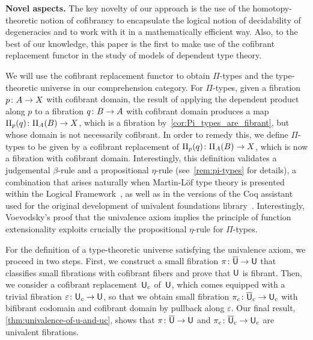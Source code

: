 \documentclass[reqno,10pt,a4paper,oneside,draft]{amsart}
\begin{document}
\smallskip

\noindent
\textbf{Novel aspects.} The key novelty of our approach is the use of the homotopy-theoretic notion of cofibrancy to encapsulate the logical notion of decidability of degeneracies and to work with it in a 
mathematically efficient way. Also, to the best of our knowledge, this paper is the first to make use of the cofibrant replacement functor in the study of models of dependent type theory.

We will use the cofibrant  replacement functor
to obtain $\Pi$-types and the type-theoretic universe in our comprehension category.  For $\Pi$-types, given a fibration $p \colon A \to X$ with cofibrant domain, the result of applying the dependent product along $p$ to a fibration $q \colon B \to A$ with cofibrant domain produces a map  $\Pi_p(q) \colon \Pi_A(B) \to X$, which is a fibration by~\cref{cor:Pi_types_are_fibrant}, but whose domain
is not necessarily cofibrant. In order to remedy this, we define  $\Pi$-types to be given by a cofibrant replacement of
$\Pi_p(q) \colon \Pi_A(B) \to X$, which is now a fibration with cofibrant domain. 
Interestingly, this definition validates
a judgemental $\beta$-rule and a propositional $\eta$-rule (see~\cref{rem:pi-types} for details), a combination that arises naturally when  Martin-L\"of type theory is presented
within the Logical Framework~\cite{nordstrom-petersson-smith:ml,GarnerR:strdp}, as well as in
the versions of the Coq assistant used for the original development of  univalent foundations
library~\cite{voevodsky:library}. Interestingly, Voevodsky's proof that the univalence axiom implies the principle of function extensionality exploits crucially the propositional $\eta$-rule for $\Pi$-types. 

For the definition of a  type-theoretic universe satisfying the univalence axiom, we proceed
in two steps. First, we construct a small fibration $\pi \colon \overline{\mathsf{U}} \to \mathsf{U}$ that classifies small fibrations with cofibrant fibers and prove that $\mathsf{U}$ is fibrant. 
Then, we consider a cofibrant replacement~$\mathsf{U}_c$ of~$\mathsf{U}$, which comes equipped with a trivial fibration $\varepsilon \colon \mathsf{U}_c \to \mathsf{U}$, so that 
we obtain small fibration $\pi_c \colon \overline{\mathsf{U}}_c \to \mathsf{U}_c$ with bifibrant codomain and cofibrant domain by pullback along $\varepsilon$. Our final result, \cref{thm:univalence-of-u-and-uc}, shows that
$\pi \colon \overline{\mathsf{U}} \to \mathsf{U}$ and $\pi_c \colon \overline{\mathsf{U}}_c \to \mathsf{U}_c$ are univalent fibrations. 
\end{document}
